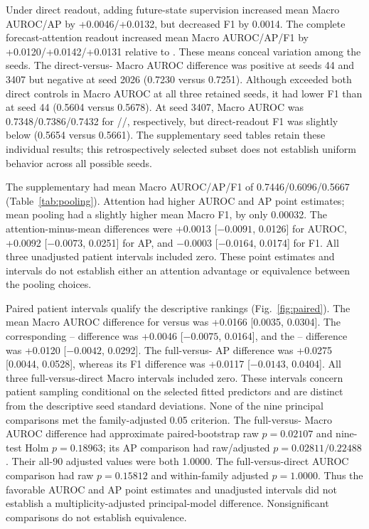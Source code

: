 Under direct readout, adding future-state supervision increased mean Macro AUROC/AP by +0.0046/+0.0132, but decreased F1 by 0.0014. The complete forecast-attention readout increased mean Macro AUROC/AP/F1 by +0.0120/+0.0142/+0.0131 relative to \direct{}. These means conceal variation among the seeds. The direct-versus-\nojepa{} Macro AUROC difference was positive at seeds 44 and 3407 but negative at seed 2026 (0.7230 versus 0.7251). Although \fullmodel{} exceeded both direct controls in Macro AUROC at all three retained seeds, it had lower F1 than \direct{} at seed 44 (0.5604 versus 0.5678). At seed 3407, Macro AUROC was 0.7348/0.7386/0.7432 for \nojepa{}/\direct{}/\fullmodel{}, respectively, but direct-readout F1 was slightly below \nojepa{} (0.5654 versus 0.5661). The supplementary seed tables retain these individual results; this retrospectively selected subset does not establish uniform behavior across all possible seeds.

The supplementary \meanmodel{} had mean Macro AUROC/AP/F1 of 0.7446/0.6096/0.5667 (Table~\ref{tab:pooling}). Attention had higher AUROC and AP point estimates; mean pooling had a slightly higher mean Macro F1, by only 0.00032. The attention-minus-mean differences were +0.0013 [$-0.0091$, 0.0126] for AUROC, +0.0092 [$-0.0073$, 0.0251] for AP, and $-0.0003$ [$-0.0164$, 0.0174] for F1. All three unadjusted patient intervals included zero. These point estimates and intervals do not establish either an attention advantage or equivalence between the pooling choices.

Paired patient intervals qualify the descriptive rankings (Fig.~\ref{fig:paired}). The mean Macro AUROC difference for \fullmodel{} versus \nojepa{} was +0.0166 [0.0035, 0.0304]. The corresponding \direct{}--\nojepa{} difference was +0.0046 [$-0.0075$, 0.0164], and the \fullmodel{}--\direct{} difference was +0.0120 [$-0.0042$, 0.0292]. The full-versus-\nojepa{} AP difference was +0.0275 [0.0044, 0.0528], whereas its F1 difference was +0.0117 [$-0.0143$, 0.0404]. All three full-versus-direct Macro intervals included zero. These intervals concern patient sampling conditional on the selected fitted predictors and are distinct from the descriptive seed standard deviations.
None of the nine principal comparisons met the family-adjusted 0.05 criterion. The full-versus-\nojepa{} Macro AUROC difference had approximate paired-bootstrap raw $p=0.02107$ and nine-test Holm $p=0.18963$; its AP comparison had raw/adjusted $p=0.02811/0.22488$. Their all-90 adjusted values were both 1.0000. The full-versus-direct AUROC comparison had raw $p=0.15812$ and within-family adjusted $p=1.0000$. Thus the favorable AUROC and AP point estimates and unadjusted intervals did not establish a multiplicity-adjusted principal-model difference. Nonsignificant comparisons do not establish equivalence.


